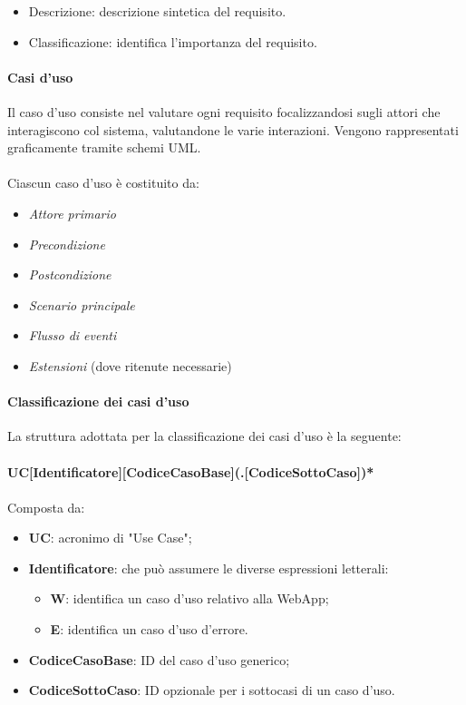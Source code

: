 \begin{itemize}
\begin{itemize}
\item Descrizione: descrizione sintetica del requisito.
\item Classificazione: identifica l’importanza del requisito.
\end{itemize}
\end{itemize}

\paragraph{Casi d'uso}
Il caso d'uso consiste nel valutare ogni requisito focalizzandosi sugli attori che interagiscono col sistema, valutandone le varie interazioni. Vengono rappresentati graficamente tramite schemi UML\glo{}. \\ 
\\
Ciascun caso d'uso è costituito da:
\begin{itemize}
\item \textit{Attore primario}
\item \textit{Precondizione}
\item \textit{Postcondizione}
\item \textit{Scenario principale}
\item \textit{Flusso di eventi}
\item \textit{Estensioni} (dove ritenute necessarie)
\end{itemize}

\paragraph{Classificazione dei casi d'uso}
La struttura adottata per la classificazione dei casi d'uso è la seguente: \\ \\
\textbf{UC[Identificatore][CodiceCasoBase](.[CodiceSottoCaso])*}
\\ \\
Composta da:
\begin{itemize}
\item \textbf{UC}: acronimo di "Use Case";
\item \textbf{Identificatore}: che può assumere le diverse espressioni letterali:
\begin{itemize}
\item \textbf{W}: identifica un caso d'uso relativo alla WebApp;
\item \textbf{E}: identifica un caso d'uso d'errore.
\end{itemize}
\item \textbf{CodiceCasoBase}: ID del caso d'uso generico;
\item \textbf{CodiceSottoCaso}: ID opzionale per i sottocasi di un caso d'uso.
\end{itemize}

